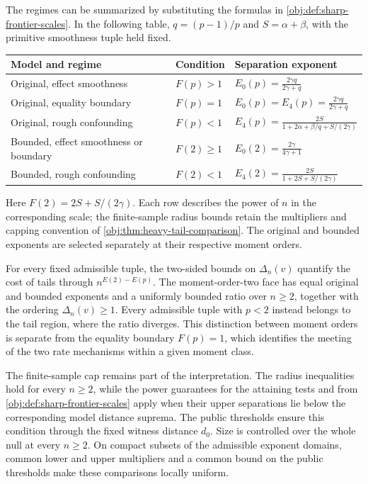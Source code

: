 \documentclass[11pt]{article}
\begin{document}
The regimes can be summarized by substituting the formulas in \cref{obj:def:sharp-frontier-scales}. In the following table, \(q=(p-1)/p\) and \(S=\alpha+\beta\), with the primitive smoothness tuple held fixed.
\begin{center}
\begin{tabular}{lll}
\hline
Model and regime & Condition & Separation exponent \\
\hline
Original, effect smoothness
& \(F(p)>1\)
& \(\displaystyle E_0(p)=\frac{2\gamma q}{2\gamma+q}\) \\[6pt]
Original, equality boundary
& \(F(p)=1\)
& \(\displaystyle E_0(p)=E_4(p)=\frac{2\gamma q}{2\gamma+q}\) \\[6pt]
Original, rough confounding
& \(F(p)<1\)
& \(\displaystyle E_4(p)=\frac{2S}{1+2\alpha+\beta/q+S/(2\gamma)}\) \\[6pt]
Bounded, effect smoothness or boundary
& \(F(2)\ge1\)
& \(\displaystyle E_0(2)=\frac{2\gamma}{4\gamma+1}\) \\[6pt]
Bounded, rough confounding
& \(F(2)<1\)
& \(\displaystyle E_4(2)=\frac{2S}{1+2S+S/(2\gamma)}\) \\[6pt]
\hline
\end{tabular}
\end{center}
Here \(F(2)=2S+S/(2\gamma)\). Each row describes the power of \(n\) in the corresponding scale; the finite-sample radius bounds retain the multipliers and capping convention of \cref{obj:thm:heavy-tail-comparison}. The original and bounded exponents are selected separately at their respective moment orders.

For every fixed admissible tuple, the two-sided bounds on \(\Delta_n(v)\) quantify the cost of tails through \(n^{E(2)-E(p)}\). The moment-order-two face has equal original and bounded exponents and a uniformly bounded ratio over \(n\ge2\), together with the ordering \(\Delta_n(v)\ge1\). Every admissible tuple with \(p<2\) instead belongs to the tail region, where the ratio diverges. This distinction between moment orders is separate from the equality boundary \(F(p)=1\), which identifies the meeting of the two rate mechanisms within a given moment class.

The finite-sample cap remains part of the interpretation. The radius inequalities hold for every \(n\ge2\), while the power guarantees for the attaining tests  and  from \cref{obj:def:sharp-frontier-scales} apply when their upper separations lie below the corresponding model distance suprema. The public thresholds ensure this condition through the fixed witness distance \(d_0\). Size is controlled over the whole null at every \(n\ge2\). On compact subsets of the admissible exponent domains, common lower and upper multipliers and a common bound on the public thresholds make these comparisons locally uniform.
\end{document}
